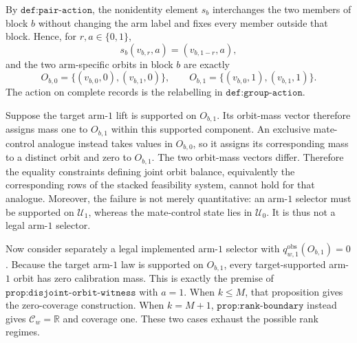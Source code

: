 By \(\texttt{def:pair-action}\), the nonidentity element \(s_b\) interchanges the two members of block \(b\) without changing the arm label and fixes every member outside that block. Hence, for \(r,a\in\{0,1\}\),
\[s_b(v_{b,r},a)=(v_{b,1-r},a),\]
and the two arm-specific orbits in block \(b\) are exactly
\[O_{b,0}=\{(v_{b,0},0),(v_{b,1},0)\},\qquad O_{b,1}=\{(v_{b,0},1),(v_{b,1},1)\}.\]
The action on complete records is the relabelling in \(\texttt{def:group-action}\).

Suppose the target arm-\(1\) lift is supported on \(O_{b,1}\). Its orbit-mass vector therefore assigns mass one to \(O_{b,1}\) within this supported component. An exclusive mate-control analogue instead takes values in \(O_{b,0}\), so it assigns its corresponding mass to a distinct orbit and zero to \(O_{b,1}\). The two orbit-mass vectors differ. Therefore the equality constraints defining joint orbit balance, equivalently the corresponding rows of the stacked feasibility system, cannot hold for that analogue. Moreover, the failure is not merely quantitative: an arm-\(1\) selector must be supported on \(\mathcal U_1\), whereas the mate-control state lies in \(\mathcal U_0\). It is thus not a legal arm-\(1\) selector.

Now consider separately a legal implemented arm-\(1\) selector with \(q^{\mathrm{obs}}_{w,1}(O_{b,1})=0\). Because the target arm-\(1\) law is supported on \(O_{b,1}\), every target-supported arm-\(1\) orbit has zero calibration mass. This is exactly the premise of \(\texttt{prop:disjoint-orbit-witness}\) with \(a=1\). When \(k\le M\), that proposition gives the zero-coverage construction. When \(k=M+1\), \(\texttt{prop:rank-boundary}\) instead gives \(\mathcal C_w=\mathbb R\) and coverage one. These two cases exhaust the possible rank regimes.